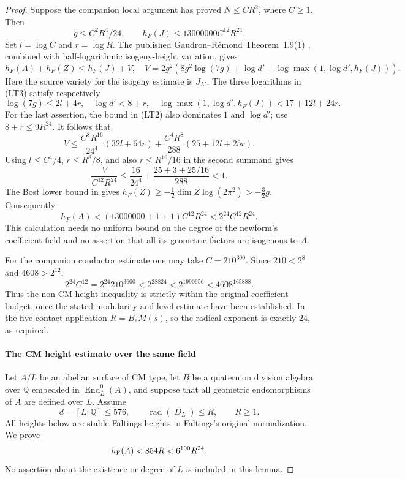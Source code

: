 \documentclass[11pt]{article}
\theoremstyle{definition}
\theoremstyle{remark}
\begin{document}
\begin{proof}
Suppose the companion local argument has proved $N\leq C R^2$,
where $C\geq1$. Then
\[
 g\leq C^2R^4/24,\qquad
 h_F(J)\leq13000000C^{12}R^{24}.
\]
Set $l=\log C$ and $r=\log R$. The published
Gaudron--R\'emond Theorem~1.9(1) \cite[pp.~7--8]{GaudronRemond2023}, combined with half-logarithmic isogeny-height variation,
gives
\[
 h_F(A)+h_F(Z)\leq h_F(J)+V,
 \quad
 V=2g^2\left(8g^2\log(7g)+\log d'
       +\log\max(1,\log d',h_F(J))\right).
\tag{LT3}
\]
Here the source variety for the isogeny estimate is $J_{L'}$.
The three logarithms in (LT3) satisfy respectively
\[
 \log(7g)\leq2l+4r,\quad
 \log d'<8+r,\quad
 \log\max(1,\log d',h_F(J))<17+12l+24r.
\]
For the last assertion, the bound in (LT2) also dominates $1$ and
$\log d'$; use $8+r\leq9R^{24}$.
It follows that
\[
 V\leq
 \frac{C^8R^{16}}{24^4}(32l+64r)
 +\frac{C^4R^8}{288}(25+12l+25r).
\tag{LT4}
\]
Using $l\leq C^4/4$, $r\leq R^8/8$, and also
$r\leq R^{16}/16$ in the second summand gives
\[
 \frac{V}{C^{12}R^{24}}
 \leq\frac{16}{24^4}+\frac{25+3+25/16}{288}<1.
\tag{LT5}
\]
The Bost lower bound in \cite[(2.2), p.~5]{vonKaenel2021}
gives $h_F(Z)\geq-\tfrac12\dim Z\log(2\pi^2)>-\tfrac32g$.
Consequently
\[
 h_F(A)<(13000000+1+1)C^{12}R^{24}
       <2^{24}C^{12}R^{24}.
\tag{LT6}
\]
This calculation needs no uniform bound on the degree of the newform's
coefficient field and no assertion that all its geometric factors are
isogenous to $A$.

For the companion conductor estimate one may take $C=210^{300}$.
Since $210<2^8$ and $4608>2^{12}$,
\[
 2^{24}C^{12}=2^{24}210^{3600}
 <2^{28824}<2^{1990656}<4608^{165888}.
\tag{LT7}
\]
Thus the non-CM height inequality is strictly within the original
coefficient budget, once the stated modularity and level estimate have
been established. In the five-contact application $R=B_*M(s)$, so
the radical exponent is exactly $24$, as required.

\paragraph{The CM height estimate over the same field}
Let $A/L$ be an abelian surface of CM type, let $B$ be a quaternion
division algebra over $\mathbb Q$ embedded in
$\operatorname{End}^0_{\overline L}(A)$, and suppose that all geometric
endomorphisms of $A$ are defined over $L$. Assume
\[
 d=[L:\mathbb Q]\le576,\qquad
 \operatorname{rad}(|D_L|)\le R,\qquad R\ge1.
\]
All heights below are stable Faltings heights in Faltings's original
normalization. We prove
\begin{equation}\label{eq:original-cm-bound}
 h_{\rm F}(A)<854R<6^{100}R^{24}.
\end{equation}
No assertion about the existence or degree of $L$ is included in this lemma.


\end{proof}
\end{document}
